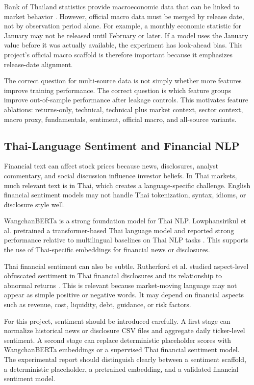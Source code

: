 \documentclass[11pt]{article}
\begin{document}
Bank of Thailand statistics provide macroeconomic data that can be linked to market behavior \cite{bot}. However, official macro data must be merged by release date, not by observation period alone. For example, a monthly economic statistic for January may not be released until February or later. If a model uses the January value before it was actually available, the experiment has look-ahead bias. This project's official macro scaffold is therefore important because it emphasizes release-date alignment.

The correct question for multi-source data is not simply whether more features improve training performance. The correct question is which feature groups improve out-of-sample performance after leakage controls. This motivates feature ablations: returns-only, technical, technical plus market context, sector context, macro proxy, fundamentals, sentiment, official macro, and all-source variants.

\subsection{Thai-Language Sentiment and Financial NLP}
Financial text can affect stock prices because news, disclosures, analyst commentary, and social discussion influence investor beliefs. In Thai markets, much relevant text is in Thai, which creates a language-specific challenge. English financial sentiment models may not handle Thai tokenization, syntax, idioms, or disclosure style well.

WangchanBERTa is a strong foundation model for Thai NLP. Lowphansirikul et al. pretrained a transformer-based Thai language model and reported strong performance relative to multilingual baselines on Thai NLP tasks \cite{wangchanberta}. This supports the use of Thai-specific embeddings for financial news or disclosures.

Thai financial sentiment can also be subtle. Rutherford et al. studied aspect-level obfuscated sentiment in Thai financial disclosures and its relationship to abnormal returns \cite{thaiabsa}. This is relevant because market-moving language may not appear as simple positive or negative words. It may depend on financial aspects such as revenue, cost, liquidity, debt, guidance, or risk factors.

For this project, sentiment should be introduced carefully. A first stage can normalize historical news or disclosure CSV files and aggregate daily ticker-level sentiment. A second stage can replace deterministic placeholder scores with WangchanBERTa embeddings or a supervised Thai financial sentiment model. The experimental report should distinguish clearly between a sentiment scaffold, a deterministic placeholder, a pretrained embedding, and a validated financial sentiment model.
\end{document}
